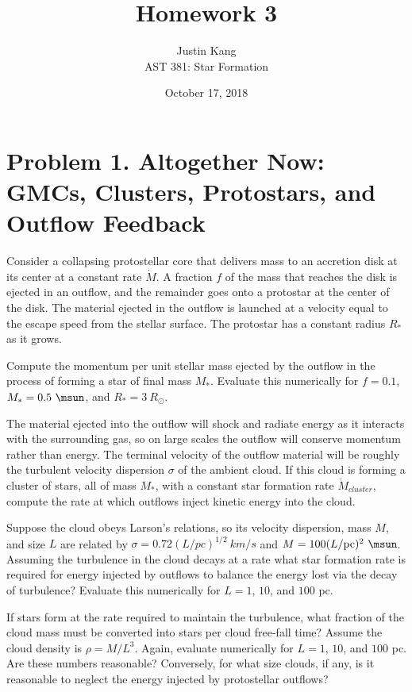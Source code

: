 \documentclass[11pt]{article}
\title{\vspace{-3em} \textbf{Homework 3}}
\author{Justin Kang \\ AST 381: Star Formation}
\date{\vspace{-0.75em} October 17, 2018}
\newenvironment{tight_enumerate}{
    \begin{enumerate}[label=(\alph*)]
    \setlength{\itemsep}{3pt}
    \setlength{\parskip}{0pt}}
    {\end{enumerate}}
\begin{document}
\maketitle
\singlespacing
{}
\sloppy



\vspace{-2.5em}
\section*{Problem 1. Altogether Now: GMCs, Clusters, Protostars, and Outflow Feedback}
Consider a collapsing protostellar core that delivers mass to an accretion disk at its center at a constant rate $\dot{M}$. A fraction $f$ of the mass that reaches the disk is ejected in an outflow, and the remainder goes onto a protostar at the center of the disk. The material ejected in the outflow is launched at a velocity equal to the escape speed from the stellar surface. The protostar has a constant radius $R_{*}$ as it grows.
\begin{tight_enumerate}
\item Compute the momentum per unit stellar mass ejected by the outflow in the process of forming a star of final mass $M_{*}$. Evaluate this numerically for $f = 0.1$, $M_{*} = 0.5\ \si{\msun}$, and $R_{*} = 3\ R_{\odot}$. 

\item The material ejected into the outflow will shock and radiate energy as it interacts with the surrounding gas, so on large scales the outflow will conserve momentum rather than energy. The terminal velocity of the outflow material will be roughly the turbulent velocity dispersion $\sigma$ of the ambient cloud. If this cloud is forming a cluster of stars, all of mass $M_{*}$, with a constant star formation rate $\dot{M}_{cluster}$, compute the rate at which outflows inject kinetic energy into the cloud.

\item Suppose the cloud obeys Larson's relations, so its velocity dispersion, mass $M$, and size $L$ are related by $\sigma = 0.72(L/\si{pc})^{1/2}\ \si{km/s}$ and $M = 100(L/\si{pc})^{2}\ \si{\msun}$. Assuming the turbulence in the cloud decays at a rate what star formation rate is required for energy injected by outflows to balance the energy lost via the decay of turbulence? Evaluate this numerically for $L = 1$, $10$, and $100$ \si{pc}.

\item If stars form at the rate required to maintain the turbulence, what fraction of the cloud mass must be converted into stars per cloud free-fall time? Assume the cloud density is $\rho = M/L^{3}$. Again, evaluate numerically for $L = 1$, $10$, and $100$ \si{pc}. Are these numbers reasonable? Conversely, for what size clouds, if any, is it reasonable to neglect the energy injected by protostellar outflows?
\end{tight_enumerate}
\end{document}
